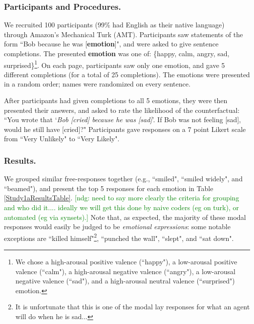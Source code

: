 \documentclass[10pt,letterpaper]{article}
\newcommand{\ndg}[1]{\textcolor{Green}{[ndg: #1]}}
\begin{document}
\subsubsection{Participants and Procedures.} 
We recruited 100 participants (99\% had English as their native language) through Amazon's Mechanical Turk (AMT). Participants saw statements of the form ``Bob \underline{\hspace{3em}} because he was [\textbf{emotion}]", and were asked to give sentence completions. The presented \textbf{emotion} was one of: \{happy, calm, angry, sad, surprised\}\footnote{We chose a high-arousal positive valence (``happy"), a low-arousal positive valence (``calm"), a high-arousal negative valence (``angry"), a low-arousal negative valence (``sad"), and a high-arousal neutral valence (``surprised") emotion.}. On each page, participants saw only one emotion, and gave 5 different completions (for a total of 25 completions). The emotions were presented in a random order; names were randomized on every sentence.

After participants had given completions to all 5 emotions, they were then presented their answers, and asked to rate the likelihood of the counterfactual: ``You wrote that `\textit{Bob [cried] because he was [sad]}'. If Bob was not feeling [sad], would he still have [cried]?" Participants gave responses on a 7 point Likert scale from ``Very Unlikely" to ``Very Likely". 




\subsubsection{Results.} 
We grouped similar free-responses together (e.g., ``smiled", ``smiled widely", and ``beamed"), and present the top 5 responses for each emotion in Table \ref{Study1aResultsTable}. 
\ndg{need to say more clearly the criteria for grouping and who did it.... ideally we will get this done by naive coders (eg on turk), or automated (eg via synsets).}
Note that, as expected, the majority of these modal responses would easily be judged to be \textit{emotional expressions}: some notable exceptions are ``killed himself"\footnote{It is unfortunate that this is one of the modal lay responses for what an agent will do when he is sad...}, ``punched the wall", ``slept", and ``sat down".
\end{document}
